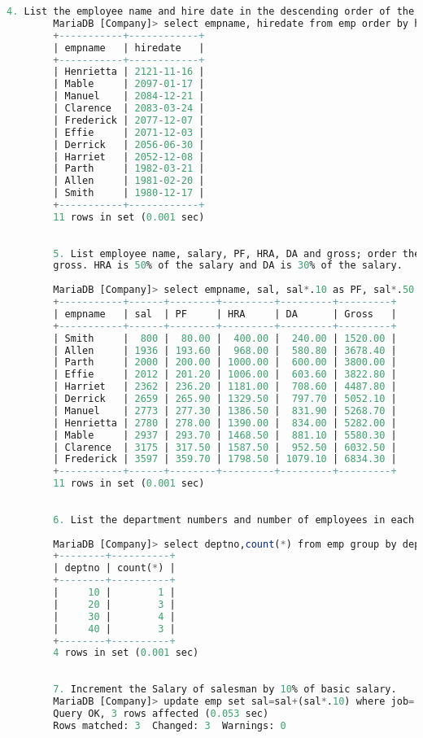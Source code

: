 \documentclass{article}
\begin{document}
\begin{lstlisting}[language=SQL]
		4. List the employee name and hire date in the descending order of the hire date. 
		MariaDB [Company]> select empname, hiredate from emp order by hiredate desc; 
		+-----------+------------+ 
		| empname   | hiredate   | 
		+-----------+------------+ 
		| Henrietta | 2121-11-16 | 
		| Mable     | 2097-01-17 | 
		| Manuel    | 2084-12-21 | 
		| Clarence  | 2083-03-24 | 
		| Frederick | 2077-12-07 | 
		| Effie     | 2071-12-03 | 
		| Derrick   | 2056-06-30 | 
		| Harriet   | 2052-12-08 | 
		| Parth     | 1982-03-21 | 
		| Allen     | 1981-02-20 | 
		| Smith     | 1980-12-17 | 
		+-----------+------------+ 
		11 rows in set (0.001 sec) 
		
		
		5. List employee name, salary, PF, HRA, DA and gross; order the results in the ascending order of 
		gross. HRA is 50% of the salary and DA is 30% of the salary. 
		
		MariaDB [Company]> select empname, sal, sal*.10 as PF, sal*.50 as HRA, sal*.30 as DA, sal + sal*.90 as Gross from emp order by Gross; 
		+-----------+------+--------+---------+---------+---------+ 
		| empname   | sal  | PF     | HRA     | DA      | Gross   | 
		+-----------+------+--------+---------+---------+---------+ 
		| Smith     |  800 |  80.00 |  400.00 |  240.00 | 1520.00 | 
		| Allen     | 1936 | 193.60 |  968.00 |  580.80 | 3678.40 | 
		| Parth     | 2000 | 200.00 | 1000.00 |  600.00 | 3800.00 | 
		| Effie     | 2012 | 201.20 | 1006.00 |  603.60 | 3822.80 | 
		| Harriet   | 2362 | 236.20 | 1181.00 |  708.60 | 4487.80 | 
		| Derrick   | 2659 | 265.90 | 1329.50 |  797.70 | 5052.10 | 
		| Manuel    | 2773 | 277.30 | 1386.50 |  831.90 | 5268.70 | 
		| Henrietta | 2780 | 278.00 | 1390.00 |  834.00 | 5282.00 | 
		| Mable     | 2937 | 293.70 | 1468.50 |  881.10 | 5580.30 | 
		| Clarence  | 3175 | 317.50 | 1587.50 |  952.50 | 6032.50 | 
		| Frederick | 3597 | 359.70 | 1798.50 | 1079.10 | 6834.30 | 
		+-----------+------+--------+---------+---------+---------+ 
		11 rows in set (0.001 sec) 
		
		
		6. List the department numbers and number of employees in each department. 
		
		MariaDB [Company]> select deptno,count(*) from emp group by deptno; 
		+--------+----------+ 
		| deptno | count(*) | 
		+--------+----------+ 
		|     10 |        1 | 
		|     20 |        3 | 
		|     30 |        4 | 
		|     40 |        3 | 
		+--------+----------+ 
		4 rows in set (0.001 sec) 
		
		
		7. Increment the Salary of salesman by 10% of basic salary. 
		MariaDB [Company]> update emp set sal=sal+(sal*.10) where job='sales'; 
		Query OK, 3 rows affected (0.053 sec) 
		Rows matched: 3  Changed: 3  Warnings: 0 
		

\end{lstlisting}
\end{document}
